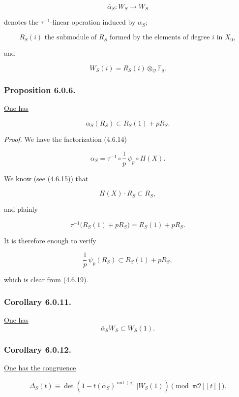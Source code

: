 \begin{equation}\tag{6.0.3}
\bar\alpha_S:W_S\longrightarrow W_S
\end{equation}

\noindent
denotes the $\tau^{-1}$-linear operation induced by $\alpha_S$;

\begin{equation}\tag{6.0.4}
R_S(i)
\text{ the submodule of $R_S$ formed by the elements of degree $i$ in $X_0$},
\end{equation}

and

\begin{equation}\tag{6.0.5}
W_S(i)=R_S(i)\otimes_{\mathcal O}\mathbb F_q.
\end{equation}

\subsubsection*{Proposition 6.0.6.}
\underline{One has}

\[
\alpha_S(R_S)\subset R_S(1)+pR_S.
\]

\noindent\emph{Proof.}
We have the factorization (4.6.14)

\begin{equation}\tag{6.0.7}
\alpha_S=\tau^{-1}\circ\frac1p\,\psi_p\circ H(X).
\end{equation}

We know (see (4.6.15)) that

\begin{equation}\tag{6.0.8}
H(X)\cdot R_S\subset R_S,
\end{equation}

and plainly

\begin{equation}\tag{6.0.9}
\tau^{-1}\bigl(R_S(1)+pR_S\bigr)=R_S(1)+pR_S.
\end{equation}

It is therefore enough to verify

\begin{equation}\tag{6.0.10}
\frac1p\,\psi_p(R_S)\subset R_S(1)+pR_S,
\end{equation}

which is clear from (4.6.19).

\subsubsection*{Corollary 6.0.11.}
\underline{One has}
\[
\bar\alpha_S W_S\subset W_S(1).
\]

\subsubsection*{Corollary 6.0.12.}
\underline{One has the congruence}

\[
\Delta_S(t)\equiv
\det\!\left(
1-t(\bar\alpha_S)^{\operatorname{ord}(q)}
\mathrel{\Big|}W_S(1)\right)
\pmod{\pi\mathcal O[[t]]}.
\]

